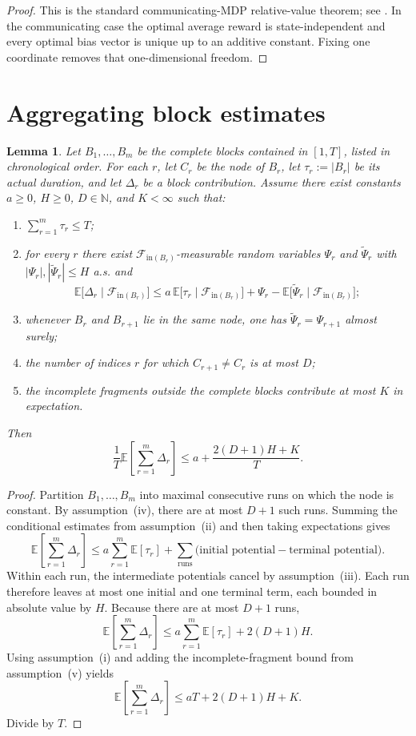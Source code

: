 \documentclass[12pt]{article}
\newtheorem{lemma}[theorem]{Lemma}
\theoremstyle{definition}
\newcommand{\N}{\mathbb{N}}
\newcommand{\E}{\mathbb{E}}
\newcommand{\1}{\mathbf{1}}
\newcommand{\cF}{\mathcal{F}}
\begin{document}
\begin{proof}
This is the standard communicating-MDP relative-value theorem; see
\cite[Chapter~8]{Puterman1994}. In the communicating case the optimal average
reward is state-independent and every optimal bias vector is unique up to an
additive constant. Fixing one coordinate removes that one-dimensional freedom.
\end{proof}


\section{Aggregating block estimates}
\label{app:aggregation}

\begin{lemma}
\label{lem:aggregation}
Let $B_1,\dots,B_m$ be the complete blocks contained in $[1,T]$, listed in
chronological order. For each $r$, let $C_r$ be the node of $B_r$, let
$\tau_r:=|B_r|$ be its actual duration, and let $\Delta_r$ be a block contribution.
Assume there exist constants $a\ge 0$, $H\ge 0$, $D\in\N$, and $K<\infty$ such that:
\begin{enumerate}[label=\textnormal{(\roman*)},leftmargin=2.6em]
\item $\sum_{r=1}^m \tau_r\le T$;
\item for every $r$ there exist $\cF_{\mathrm{in}(B_r)}$-measurable random variables
$\Psi_r$ and $\widetilde\Psi_r$ with $|\Psi_r|,|\widetilde\Psi_r|\le H$ a.s. and
\[
\E\bigl[\Delta_r\mid \cF_{\mathrm{in}(B_r)}\bigr]
\le
a\,\E\bigl[\tau_r\mid \cF_{\mathrm{in}(B_r)}\bigr]
+
\Psi_r-\E\bigl[\widetilde\Psi_r\mid \cF_{\mathrm{in}(B_r)}\bigr];
\]
\item whenever $B_r$ and $B_{r+1}$ lie in the same node, one has
$\widetilde\Psi_r=\Psi_{r+1}$ almost surely;
\item the number of indices $r$ for which $C_{r+1}\neq C_r$ is at most $D$;
\item the incomplete fragments outside the complete blocks contribute at most $K$
in expectation.
\end{enumerate}
Then
\[
\frac1T\E\left[\sum_{r=1}^m \Delta_r\right]
\le a + \frac{2(D+1)H+K}{T}.
\]
\end{lemma}

\begin{proof}
Partition $B_1,\dots,B_m$ into maximal consecutive runs on which the node is
constant. By assumption~(iv), there are at most $D+1$ such runs. Summing the
conditional estimates from assumption~(ii) and then taking expectations gives
\[
\E\left[\sum_{r=1}^m \Delta_r\right]
\le
a\sum_{r=1}^m \E[\tau_r]
+
\sum_{\text{runs}}
\bigl(\text{initial potential} - \text{terminal potential}\bigr).
\]
Within each run, the intermediate potentials cancel by assumption~(iii). Each run
therefore leaves at most one initial and one terminal term, each bounded in
absolute value by $H$. Because there are at most $D+1$ runs,
\[
\E\left[\sum_{r=1}^m \Delta_r\right]
\le
a\sum_{r=1}^m \E[\tau_r] + 2(D+1)H.
\]
Using assumption~(i) and adding the incomplete-fragment bound from assumption~(v)
yields
\[
\E\left[\sum_{r=1}^m \Delta_r\right]
\le
aT + 2(D+1)H + K.
\]
Divide by $T$.
\end{proof}
\end{document}
